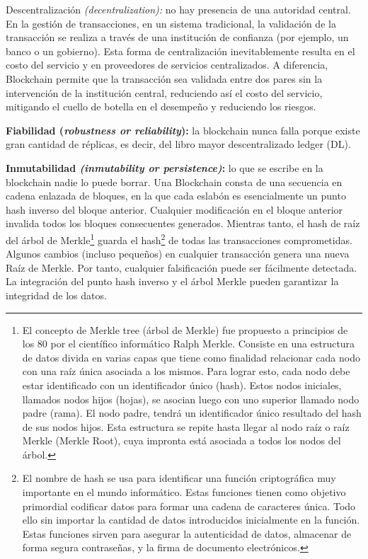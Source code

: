 \documentclass[12pt]{report} %
\begin{document}
 \textbf{}Descentralización \textit{(decentralization):} no hay presencia de una autoridad central. En la gestión de transacciones, en un sistema tradicional, la validación de la transacción se realiza a través de una institución de confianza (por ejemplo, un banco o un gobierno). Esta forma de centralización inevitablemente resulta en el costo del servicio y en proveedores de servicios centralizados. A diferencia, Blockchain permite que la transacción sea validada entre dos pares sin la intervención de la institución central, reduciendo así el costo del servicio, mitigando el cuello de botella en el desempeño y reduciendo los riesgos.
 
\textbf{Fiabilidad (\textit{robustness or reliability}):} la blockchain nunca falla porque existe gran cantidad de réplicas, es decir, del libro mayor descentralizado ledger (DL). 

\textbf{Inmutabilidad \textit{(inmutability or persistence)}:} lo que se escribe en la blockchain nadie lo puede borrar. Una Blockchain consta de una secuencia en cadena enlazada de bloques, en la que cada eslabón es esencialmente un punto hash inverso del bloque anterior. Cualquier modificación en el bloque anterior invalida todos los bloques consecuentes generados. Mientras tanto, el hash de raíz del árbol de Merkle\footnote{El concepto de Merkle tree (árbol de Merkle) fue propuesto a principios de los 80 por el científico informático Ralph Merkle. Consiste en una estructura de datos divida en varias capas que tiene como finalidad relacionar cada nodo con una raíz única asociada a los mismos. Para lograr esto, cada nodo debe estar identificado con un identificador único (hash). Estos nodos iniciales, llamados nodos hijos (hojas), se asocian luego con uno superior llamado nodo padre (rama). El nodo padre, tendrá un identificador único resultado del hash de sus nodos hijos. Esta estructura se repite hasta llegar al nodo raíz o raíz Merkle (Merkle Root), cuya impronta está asociada a todos los nodos del árbol.}  guarda el hash\footnote{El nombre de hash se usa para identificar una función criptográfica muy importante en el mundo informático. Estas funciones tienen como objetivo primordial codificar datos para formar una cadena de caracteres única. Todo ello sin importar la cantidad de datos introducidos inicialmente en la función. Estas funciones sirven para asegurar la autenticidad de datos, almacenar de forma segura contraseñas, y la firma de documento electrónicos.}  de todas las transacciones comprometidas. Algunos cambios (incluso pequeños) en cualquier transacción genera una nueva Raíz de Merkle. Por tanto, cualquier falsificación puede ser fácilmente detectada. La integración del punto hash inverso y el árbol Merkle pueden garantizar la integridad de los datos.
\end{document}
